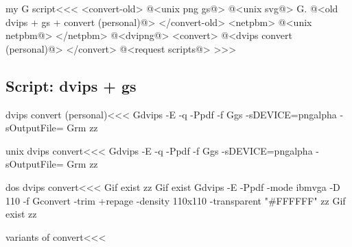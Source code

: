 \documentclass{article}
\begin{document}
\<my G script\><<<
<convert-old>
@<unix png gs@>
@<unix svg@>
G.
@<old dvips + gs + convert (personal)@> 
</convert-old>
<netpbm>
@<unix netpbm@>
</netpbm>
@<dvipng@>
 <convert>
@<dvips convert (personal)@>
 </convert>
@<request scripts@> %
>>>



\subsection{Script: dvips + gs}

\<dvips convert (personal)\><<<
Gdvips -E -q -Ppdf -f %
Ggs -sDEVICE=pngalpha -sOutputFile=%
Grm zz%

\<unix dvips convert\><<<
Gdvips -E -q -Ppdf -f %
Ggs -sDEVICE=pngalpha -sOutputFile=%
Grm zz%


\<dos dvips convert\><<<
Gif exist zz%
Gif exist %
Gdvips -E -Ppdf -mode ibmvga -D 110 -f %
Gconvert -trim +repage -density 110x110 -transparent "#FFFFFF" zz%
Gif exist zz%



\<variants of convert\><<<
\end{document}
